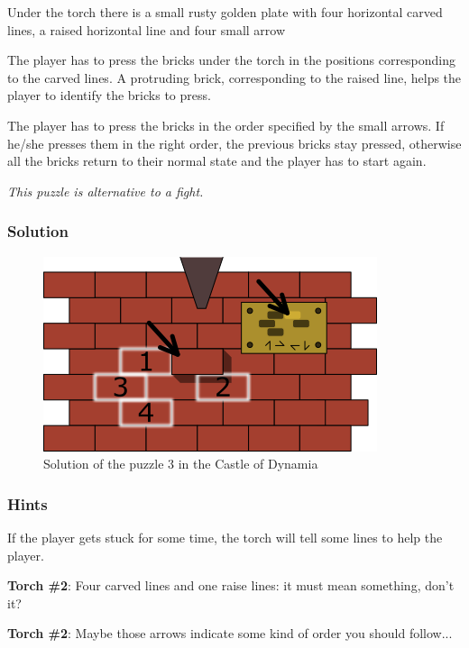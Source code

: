 
Under the torch there is a small rusty golden plate with four horizontal carved lines, a raised horizontal line and four small arrow

The player has to press the bricks under the torch in the positions corresponding to the carved lines. A protruding brick, corresponding to the raised line, helps the player to identify the bricks to press.

The player has to press the bricks in the order specified by the small arrows. If he/she presses them in the right order, the previous bricks stay pressed, otherwise all the bricks return to their normal state and the player has to start again.

\textit{This puzzle is alternative to a fight.}

\subsubsection*{Solution}
\begin{figure}[H]
  \centering
  \includegraphics[width=\textwidth]{Images/Puzzles/castleOfDynamia3Solution}
  \caption{Solution of the puzzle 3 in the Castle of Dynamia}
\end{figure}

\subsubsection*{Hints}
If the player gets stuck for some time, the torch will tell some lines to help the player.

\textbf{Torch \#{}2}: Four carved lines and one raise lines: it must mean something, don't it?

\textbf{Torch \#{}2}: Maybe those arrows indicate some kind of order you should follow...

